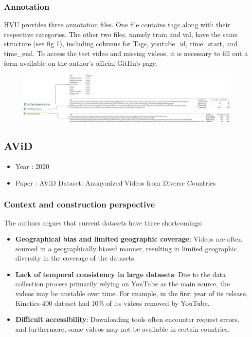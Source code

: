 \documentclass[10pt,onecolumn,letterpaper]{article}
\begin{document}
\subsubsection{Annotation}

HVU provides three annotation files. One file contains tags along with their respective categories. The other two files, namely train and val, have the same structure (see fig \ref{fig:untitled-diagram5}), including columns for Tags, youtube\_id, time\_start, and time\_end. To access the test video and missing videos, it is necessary to fill out a form available on the author's official GitHub page.

\begin{figure}[h]
	\centering
	\includegraphics[width=0.7\linewidth]{"fig_info/fig5/Untitled Diagram.drawio"}
	\caption{}
	\label{fig:untitled-diagram5}
\end{figure}

\subsection{AViD}

\begin{itemize}
	\item Year : 2020
	\item Paper : AViD Dataset: Anonymized Videos from Diverse Countries \cite{AViD}
\end{itemize}

\subsubsection{Context and construction perspective}
The authors argues that current datasets have three shortcomings:
\begin{itemize}
	\item \textbf{Geographical bias and limited geographic coverage}: Videos are often sourced in a geographically biased manner, resulting in limited geographic diversity in the coverage of the datasets.

	\item \textbf{Lack of temporal consistency in large datasets}: Due to the data collection process primarily relying on YouTube as the main source, the videos may be unstable over time. For example, in the first year of its release, Kinetics-400 dataset had 10\% of its videos removed by YouTube.

	\item \textbf{Difficult accessibility}: Downloading tools often encounter request errors, and furthermore, some videos may not be available in certain countries.
\end{itemize}
\end{document}
